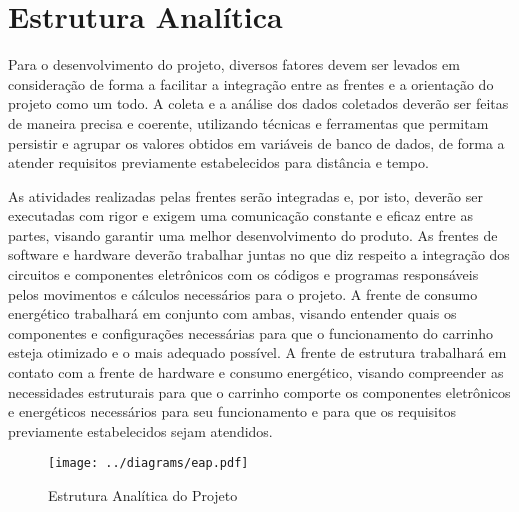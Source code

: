 \section{Estrutura Analítica}

Para o desenvolvimento do projeto, diversos fatores devem ser levados em
consideração de forma a facilitar a integração entre as frentes e a orientação
do projeto como um todo. A coleta e a análise dos dados coletados deverão ser
feitas de maneira precisa e coerente, utilizando técnicas e ferramentas que
permitam persistir e agrupar os valores obtidos em variáveis de banco de dados,
de forma a atender requisitos previamente estabelecidos para distância e tempo.

As atividades realizadas pelas frentes serão integradas e, por isto, deverão ser
executadas com rigor e exigem uma comunicação constante e eficaz entre as
partes, visando garantir uma melhor desenvolvimento do produto. As frentes de
software e hardware deverão trabalhar juntas no que diz respeito a integração
dos circuitos e componentes eletrônicos com os códigos e programas responsáveis
pelos movimentos e cálculos necessários para o projeto. A frente de consumo
energético trabalhará em conjunto com ambas, visando entender quais os
componentes e configurações necessárias para que o funcionamento do carrinho
esteja otimizado e o mais adequado possível. A frente de estrutura trabalhará em
contato com a frente de hardware e consumo energético, visando compreender as
necessidades estruturais para que o carrinho comporte os componentes eletrônicos
e energéticos necessários para seu funcionamento e para que os requisitos
previamente estabelecidos sejam atendidos.

%
%
\newpage

\begin{figure}[htb]
  \caption{\label{fig:eap} Estrutura Analítica do Projeto}

  \begin{center}
    \texttt{[image: ../diagrams/eap.pdf]}
  \end{center}

\end{figure}
